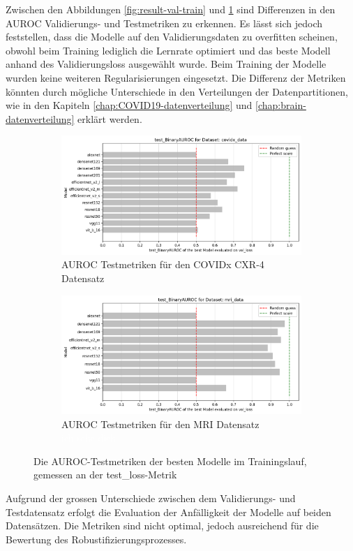 Zwischen den Abbildungen \ref{fig:result-val-train} und \ref{fig:result-test-train} sind  Differenzen in den AUROC Validierungs- und Testmetriken zu erkennen. Es lässt sich jedoch feststellen, dass die Modelle auf den Validierungsdaten zu overfitten scheinen, obwohl beim Training lediglich die Lernrate optimiert und das beste Modell anhand des Validierungsloss ausgewählt wurde. Beim Training der Modelle wurden keine weiteren Regularisierungen eingesetzt. Die Differenz der Metriken könnten durch mögliche Unterschiede in den Verteilungen der Datenpartitionen, wie in den Kapiteln \ref{chap:COVID19-datenverteilung} und \ref{chap:brain-datenverteilung} erklärt werden. 

\begin{figure}[H]
    \centering
    \begin{subfigure}{0.49\linewidth}
        \centering
        \includegraphics[height=0.49\linewidth]{01-images/05-resultate/test_binaryAUROC_COVIDX.png}
        \caption{AUROC Testmetriken für den COVIDx CXR-4 Datensatz}
    \end{subfigure}\hfill%
    \centering
    \begin{subfigure}{0.49\linewidth}
        \centering
        \includegraphics[height=0.49\linewidth]{01-images/05-resultate/test_binaryAUROC_MRI.png}
        \caption{AUROC Testmetriken für den MRI Datensatz\\\textcolor{white}{ich sehe dich}}
    \end{subfigure}
    \caption{Die AUROC-Testmetriken der besten Modelle im Trainingslauf, gemessen an der test\_loss-Metrik}
    \label{fig:result-test-train}
\end{figure}

Aufgrund der grossen Unterschiede zwischen dem Validierungs- und Testdatensatz erfolgt die Evaluation der Anfälligkeit der Modelle auf beiden Datensätzen. Die Metriken sind nicht optimal, jedoch ausreichend für die Bewertung des Robustifizierungsprozesses.

\newpage

